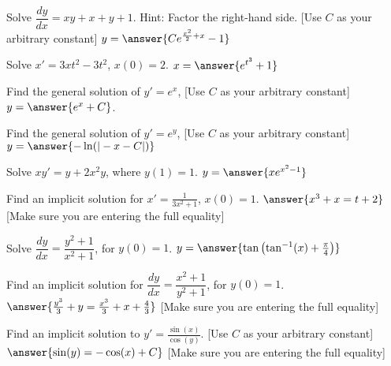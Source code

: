 \documentclass{ximera}
\begin{document}
\begin{exercise}
    Solve $\dfrac{dy}{dx} = xy+x+y+1$.  Hint: Factor the right-hand side. [Use $C$ as your arbitrary constant] $y = \answer{Ce^{\frac{x^2}{2} + x} - 1}$
\end{exercise}

\begin{exercise}%
    Solve $x'=3xt^2-3t^2$, $x(0)=2$. $x = \answer{e^{t^3}+1}$
\end{exercise}

\begin{exercise}
    Find the general solution of $y' = e^x$, [Use $C$ as your arbitrary constant] $y = \answer{e^x + C}$.
\end{exercise}
\begin{exercise}
    Find the general solution of $y' = e^y$, [Use $C$ as your arbitrary constant] $y = \answer{-\ln(|-x-C|)}$
\end{exercise}

\begin{exercise}
    Solve $xy' = y + 2x^2 y$, where $y(1) = 1$. $y = \answer{xe^{x^2 - 1}}$
\end{exercise}

\begin{exercise}%
    Find an implicit solution for $x'=\frac{1}{3x^2+1}$, $x(0)=1$. $\answer{x^3 + x = t + 2}$ [Make sure you are entering the full equality]
\end{exercise}

\begin{exercise}
    Solve $\dfrac{dy}{dx} = \dfrac{y^2+1}{x^2+1}$, for $y(0) = 1$. $y = \answer{\tan\left(\tan^{-1}(x) + \frac{\pi}{4}\right)}$
\end{exercise}

\begin{exercise}
    Find an implicit solution for $\dfrac{dy}{dx} = \dfrac{x^2+1}{y^2+1}$, for $y(0) = 1$. $\answer{\frac{y^3}{3} + y = \frac{x^3}{3} + x + \frac{4}{3}}$ [Make sure you are entering the full equality]
\end{exercise}

\begin{exercise}%
    Find an implicit solution to $y' = \frac{\sin(x)}{\cos(y)}$. [Use $C$ as your arbitrary constant] $\answer{\sin(y) = -\cos(x) + C}$ [Make sure you are entering the full equality]
\end{exercise}
\end{document}
